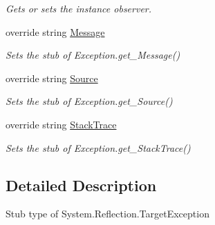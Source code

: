 \begin{DoxyCompactItemize}
\begin{DoxyCompactList}\small\item\em Gets or sets the instance observer.\end{DoxyCompactList}\item 
override string \hyperlink{class_system_1_1_reflection_1_1_fakes_1_1_stub_target_exception_a8f38f94b695861c833474c2290cabc0b}{Message}
\begin{DoxyCompactList}\small\item\em Sets the stub of Exception.\-get\-\_\-\-Message()\end{DoxyCompactList}\item 
override string \hyperlink{class_system_1_1_reflection_1_1_fakes_1_1_stub_target_exception_ac32401e5464f3653d24c16dd7b7cbb32}{Source}
\begin{DoxyCompactList}\small\item\em Sets the stub of Exception.\-get\-\_\-\-Source()\end{DoxyCompactList}\item 
override string \hyperlink{class_system_1_1_reflection_1_1_fakes_1_1_stub_target_exception_a772fc0435363179cf29b35a6b93b4377}{Stack\-Trace}
\begin{DoxyCompactList}\small\item\em Sets the stub of Exception.\-get\-\_\-\-Stack\-Trace()\end{DoxyCompactList}\end{DoxyCompactItemize}


\subsection{Detailed Description}
Stub type of System.\-Reflection.\-Target\-Exception



